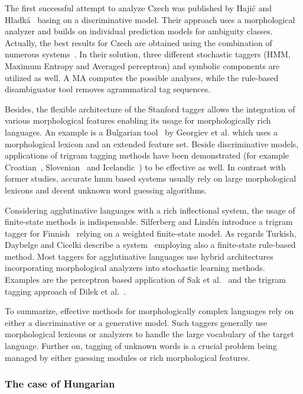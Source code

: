 The first successful attempt to analyze Czech was published by Hajič and Hladká~\cite{Hajic1998a} basing on a discriminative model.
Their approach uses a morphological analyzer and builds on individual prediction models for ambiguity classes.
Actually, the best results for Czech are obtained using the combination of numerous systems~\cite{Hajic2007}.
In their solution, three different stochastic taggers (HMM, Maximum Entropy and Averaged perceptron) and symbolic components are utilized as well.
A MA computes the possible analyses, while the rule-based disambiguator tool removes agrammatical tag sequences. 

Besides, the flexible architecture of the Stanford tagger \cite{Toutanova2003} allows the integration of various morphological features enabling its usage for morphologically rich languages.
An example is a Bulgarian tool~\cite{Georgiev2012} by Georgiev et al. which uses a morphological lexicon and an extended feature set.
Beside discriminative models, applications of trigram tagging methods \cite{Brants2000,Halacsy2007} have been demonstrated (for example Croatian~\cite{Agic2013}, Slovenian~\cite{Agic2013} and Icelandic~\cite{Loftsson2007}) to be effective as well.
In contrast with former studies, accurate \acrlong{hmm} based systems usually rely on large morphological lexicons and decent unknown word guessing algorithms.

Considering agglutinative languages with a rich inflectional system, the usage of finite-state methods is indispensable.
Silferberg and Lindén introduce a trigram tagger for Finnish~\cite{Silfverberg2011} relying on a weighted finite-state model.
As regards Turkish, Daybelge and Cicelki describe a system~\cite{Daybelge2007} employing also a finite-state rule-based method.
Most taggers for agglutinative languages use hybrid architectures incorporating morphological analyzers into stochastic learning methods.
Examples are the perceptron based application of Sak et al.~\cite{Sak2007} and the trigram tagging approach of Dilek et al.~\cite{Hakkani-Tur2002}.

To summarize, effective methods for morphologically complex languages rely on either a discriminative or a generative model.
Such taggers generally use morphological lexicons or analyzers to handle the large vocabulary of the target language.
Further on, tagging of unknown words is a crucial problem being managed by either guessing modules or rich morphological features. 

\subsubsection{The case of Hungarian}

